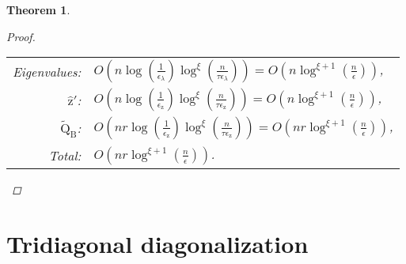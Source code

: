 \documentclass{article}
\newcommand{\lpar}{\left(}
\newcommand{\rpar}{\right)}
\newtheorem{theorem}{Theorem}[section]
\newcommand\vecz{\boldsymbol{\mathrm{z}}}
\newcommand\veczhat{\widehat{\boldsymbol{\mathrm{z}}}}
\newcommand\matB{\boldsymbol{\mathrm{B}}}
\newcommand\matQtilde{\widetilde{\boldsymbol{\mathrm{Q}}}}
\newcommand{\cfmm}{\xi}
\begin{document}
\begin{theorem}
\begin{proof}
\begin{tabular}{r l}
            Eigenvalues:
            &
            $O\lpar
                n\log(\tfrac{1}{\epsilon_{\lambda}})\log^{\cfmm}(\frac{n}{\tau\epsilon_{\lambda}})
            \rpar
            =
            O\lpar
                n\log^{\cfmm+1}(\frac{n}{\epsilon})
            \rpar$,
            \\
            $\veczhat'$:
            &
            $O\lpar
                n\log(\tfrac{1}{\epsilon_{\vecz}})\log^{\cfmm}(\frac{n}{\tau\epsilon_{\vecz}})
            \rpar
            =
            O\lpar
                n\log^{\cfmm+1}(\frac{n}{\epsilon})
            \rpar$,
            \\
            $\matQtilde_{\matB}$:
            &
            $O\lpar 
                nr\log(\tfrac{1}{\epsilon_{\vecz}})\log^{\cfmm}(\frac{n}{\tau\epsilon_{\vecz}})
            \rpar
            =
            O\lpar nr\log^{\cfmm+1}(\tfrac{n}{\epsilon})\rpar
            $,
            \\
            Total: 
            &
            $O\lpar nr\log^{\cfmm+1}(\tfrac{n}{\epsilon})\rpar$.
        \end{tabular}

        
    \end{proof}
\end{theorem}


\section{Tridiagonal diagonalization}
\label{appendix:tridiagonal_diagonalization}
\end{document}
